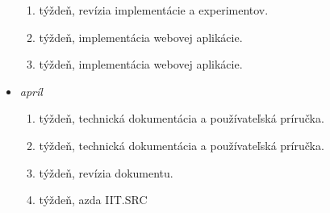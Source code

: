 \begin{itemize}
\begin{enumerate}
            \item týždeň, revízia implementácie a experimentov.
            \item týždeň, implementácia webovej aplikácie.
            \item týždeň, implementácia webovej aplikácie.
        \end{enumerate}
    \item \textit{apríl}
        \begin{enumerate}
            \item týždeň, technická dokumentácia a používateľská príručka.
            \item týždeň, technická dokumentácia a používateľská príručka.
            \item týždeň, revízia dokumentu.
            \item týždeň, azda IIT.SRC
        \end{enumerate}                        
\end{itemize}

\label{app.01}

